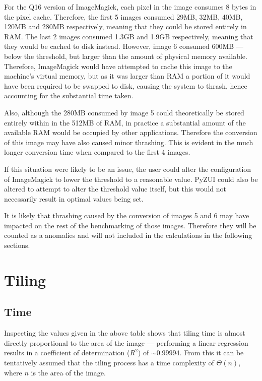 \documentclass{report}
\begin{document}
  For the Q16 version of ImageMagick, each pixel in the image consumes 8 bytes
  in the pixel cache. Therefore, the first 5 images consumed 29MB, 32MB, 40MB,
  120MB and 280MB respectively, meaning that they could be stored entirely in
  RAM. The last 2 images consumed 1.3GB and 1.9GB respectively, meaning that
  they would be cached to disk instead. However, image 6 consumed 600MB ---
  below the threshold, but larger than the amount of physical memory available.
  Therefore, ImageMagick would have attempted to cache this image to the
  machine's virtual memory, but as it was larger than RAM a portion of it would
  have been required to be swapped to disk, causing the system to thrash, hence
  accounting for the substantial time taken.

  Also, although the 280MB consumed by image 5 could theoretically be stored
  entirely within in the 512MB of RAM, in practice a substantial amount of the
  available RAM would be occupied by other applications. Therefore the
  conversion of this image may have also caused minor thrashing. This is
  evident in the much longer conversion time when compared to the first 4
  images.

  If this situation were likely to be an issue, the user could alter the
  configuration of ImageMagick to lower the threshold to a reasonable value.
  PyZUI could also be altered to attempt to alter the threshold value itself,
  but this would not necessarily result in optimal values being set.

  It is likely that thrashing caused by the conversion of images 5 and 6 may
  have impacted on the rest of the benchmarking of those images. Therefore they
  will be counted as a anomalies and will not included in the calculations in
  the following sections.

  \section{Tiling}
  \subsection{Time}
  Inspecting the values given in the above table shows that tiling time is
  almost directly proportional to the area of the image --- performing a
  linear regression results in a coefficient of determination ($R^2$) of
  $\sim0.99994$. From this it can be tentatively assumed that the tiling
  process has a time complexity of $\Theta(n)$, where $n$ is the area of the
  image.
\end{document}
